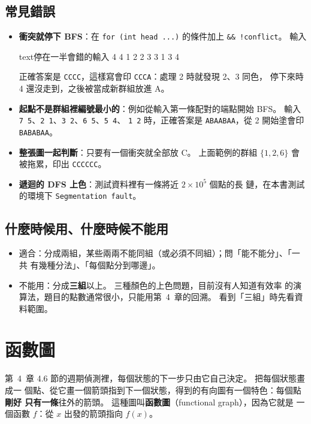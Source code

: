 \subsection{常見錯誤}

\begin{itemize}
\item \textbf{衝突就停下 BFS}：在 \texttt{for (int head ...)} 的條件加上
\texttt{\&\& !conflict}。 輸入
\begin{code}{text}{停在一半會錯的輸入}
4 4
1 2
2 3
3 1
3 4
\end{code}
正確答案是 \texttt{CCCC}，這樣寫會印 \texttt{CCCA}：處理 2 時就發現 2、3 同色，
停下來時 4 還沒走到，之後被當成新群組放進 A。
\item \textbf{起點不是群組裡編號最小的}：例如從輸入第一條配對的端點開始 BFS。
輸入 \texttt{7 5}、\texttt{2 1}、\texttt{3 2}、\texttt{6 5}、\texttt{5 4}、
\texttt{1 2} 時，正確答案是 \texttt{ABAABAA}，從 2 開始塗會印
\texttt{BABABAA}。
\item \textbf{整張圖一起判斷}：只要有一個衝突就全部放 C。 上面範例的群組
$\{1, 2, 6\}$ 會被拖累，印出 \texttt{CCCCCC}。
\item \textbf{遞迴的 DFS 上色}：測試資料裡有一條將近 $2 \times 10^5$ 個點的長
鏈，在本書測試的環境下 \texttt{Segmentation fault}。
\end{itemize}

\subsection{什麼時候用、什麼時候不能用}

\begin{itemize}
\item 適合：分成兩組，某些兩兩不能同組（或必須不同組）；問「能不能分」、「一共
有幾種分法」、「每個點分到哪邊」。
\item 不能用：分成\textbf{三組}以上。 三種顏色的上色問題，目前沒有人知道有效率
的演算法，題目的點數通常很小，只能用第~4~章的回溯。 看到「三組」時先看資料範圍。
\end{itemize}

\section{函數圖}
\label{sec:functional}

第~4~章 4.6 節的週期偵測裡，每個狀態的下一步只由它自己決定。 把每個狀態畫成一
個點、從它畫一個箭頭指到下一個狀態，得到的有向圖有一個特色：每個點\textbf{剛好
只有一條}往外的箭頭。 這種圖叫\textbf{函數圖}（functional graph），因為它就是
一個函數 $f$：從 $x$ 出發的箭頭指向 $f(x)$。

